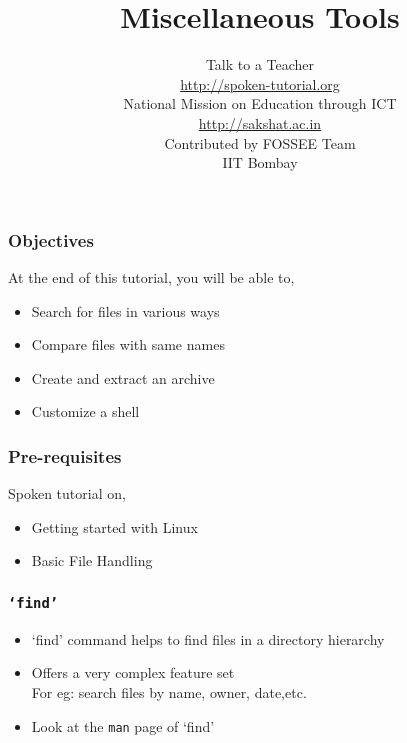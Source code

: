 \documentclass[17pt,compress]{beamer}
\author[FOSSEE]{}
\institute[IIT Bombay]{}
\date[]{}
\begin{document}
\sffamily \bfseries
\title
[Miscellaneous Tools]
{Miscellaneous Tools}
\author
[FOSSEE]
{\small Talk to a Teacher\\{\color{blue}\url{http://spoken-tutorial.org}}\\\vspace{0.25cm}National Mission on Education
 through ICT\\{\color{blue}\url{ http://sakshat.ac.in}} \\ [1.9cm]
   Contributed by FOSSEE Team \\IIT Bombay  \\[0.3cm]
}

\begin{frame}
   \titlepage
\end{frame}


\begin{frame}
\frametitle{Objectives}
\label{sec-2}

At the end of this tutorial, you will be able to,
\begin{itemize}
\item Search for files in various ways
\item Compare files with same names
\item Create and extract an archive
\item Customize a shell
\end{itemize}
\end{frame}

\begin{frame}
\frametitle{Pre-requisites}
\label{sec-3}

Spoken tutorial on,
\begin{itemize}
\item Getting started with Linux
\item Basic File Handling
\end{itemize}
\end{frame}

\begin{frame}[fragile]
  \frametitle{\texttt{`find'}}
  \begin{itemize}
  \item `find' command helps to find files in a directory hierarchy
  \item Offers a very complex feature set\\ For eg: search files by name, owner, date,etc.
  \item Look at the \texttt{man} page of `find' 
  \end{itemize}
\end{frame}
\end{document}
